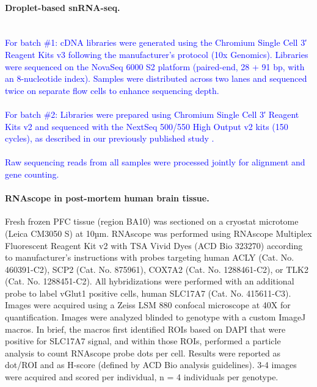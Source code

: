 \paragraph{Droplet-based snRNA-seq.}\\ 
\newcommand{\quoteJ}{\textcolor{blue}{For batch \#1: cDNA libraries were generated using the Chromium Single Cell 3′ Reagent Kits v3 following the manufacturer's protocol (10x Genomics). Libraries were sequenced on the NovaSeq 6000 S2 platform (paired-end, 28 + 91 bp, with an 8-nucleotide index). Samples were distributed across two lanes and sequenced twice on separate flow cells to enhance sequencing depth.\label{quoteJ-label}}}
\quoteJ\\\\
\newcommand{\quoteK}{\textcolor{blue}{For batch \#2: Libraries were prepared using Chromium Single Cell 3′ Reagent Kits v2 and sequenced with the NextSeq 500/550 High Output v2 kits (150 cycles), as described in our previously published study \cite{Mathys2019-dl}.}}
\quoteK\\\\
\newcommand{\quoteZ}{\textcolor{blue}{Raw sequencing reads from all samples were processed jointly for alignment and gene counting.}}
\quoteZ\\

\paragraph{RNAscope in post-mortem human brain tissue.}
Fresh frozen PFC tissue (region BA10) was sectioned on a cryostat microtome (Leica CM3050 S) at 10µm. RNAscope was performed using RNAscope Multiplex Fluorescent Reagent Kit v2 with TSA Vivid Dyes (ACD Bio 323270) according to manufacturer’s instructions with probes targeting human ACLY (Cat. No. 460391-C2), SCP2 (Cat. No. 875961), COX7A2 (Cat. No. 1288461-C2), or TLK2 (Cat. No. 1288451-C2). All hybridizations were performed with an additional probe to label vGlut1 positive cells, human SLC17A7 (Cat. No. 415611-C3). Images were acquired using a Zeiss LSM 880 confocal microscope at 40X for quantification. Images were analyzed blinded to genotype with a custom ImageJ macros. In brief, the macros first identified ROIs based on DAPI that were positive for SLC17A7 signal, and within those ROIs, performed a particle analysis to count RNAscope probe dots per cell. Results were reported as dot/ROI and as H-score (defined by ACD Bio analysis guidelines). 3-4 images were acquired and scored per individual, n = 4 individuals per genotype.

